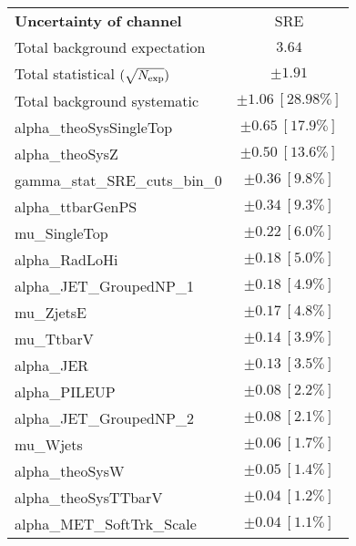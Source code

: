 
\begin{table}
\begin{center}
\setlength{\tabcolsep}{0.0pc}
\begin{tabular*}{\textwidth}{@{\extracolsep{\fill}}lc}
\noalign{\smallskip}\hline\noalign{\smallskip}
{\bf Uncertainty of channel}                                    & SRE            \\
\noalign{\smallskip}\hline\noalign{\smallskip}
Total background expectation             &  $3.64$       \\
\noalign{\smallskip}\hline\noalign{\smallskip}
Total statistical $(\sqrt{N_{\rm exp}})$              & $\pm 1.91$       \\
Total background systematic               & $\pm 1.06\ [28.98\%] $             \\
\noalign{\smallskip}\hline\noalign{\smallskip}
\noalign{\smallskip}\hline\noalign{\smallskip}
alpha\_theoSysSingleTop         & $\pm 0.65\ [17.9\%] $       \\
alpha\_theoSysZ         & $\pm 0.50\ [13.6\%] $       \\
gamma\_stat\_SRE\_cuts\_bin\_0         & $\pm 0.36\ [9.8\%] $       \\
alpha\_ttbarGenPS         & $\pm 0.34\ [9.3\%] $       \\
mu\_SingleTop         & $\pm 0.22\ [6.0\%] $       \\
alpha\_RadLoHi         & $\pm 0.18\ [5.0\%] $       \\
alpha\_JET\_GroupedNP\_1         & $\pm 0.18\ [4.9\%] $       \\
mu\_ZjetsE         & $\pm 0.17\ [4.8\%] $       \\
mu\_TtbarV         & $\pm 0.14\ [3.9\%] $       \\
alpha\_JER         & $\pm 0.13\ [3.5\%] $       \\
alpha\_PILEUP         & $\pm 0.08\ [2.2\%] $       \\
alpha\_JET\_GroupedNP\_2         & $\pm 0.08\ [2.1\%] $       \\
mu\_Wjets         & $\pm 0.06\ [1.7\%] $       \\
alpha\_theoSysW         & $\pm 0.05\ [1.4\%] $       \\
alpha\_theoSysTTbarV         & $\pm 0.04\ [1.2\%] $       \\
alpha\_MET\_SoftTrk\_Scale         & $\pm 0.04\ [1.1\%] $       \\

\end{tabular*}
\end{center}
\end{table}
